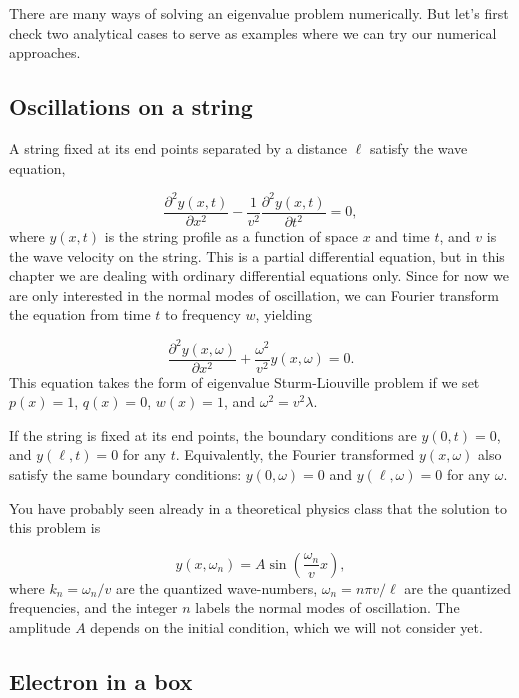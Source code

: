 There are many ways of solving an eigenvalue problem numerically. But let's first check two analytical cases to serve as examples where we can try our numerical approaches.

\subsection{Oscillations on a string}

A string fixed at its end points separated by a distance $\ell$ satisfy the wave equation,

\begin{equation}
 \dfrac{\partial^2 y(x,t)}{\partial x^2} - \dfrac{1}{v^2} \dfrac{\partial^2 y(x,t)}{\partial t^2} = 0,
\end{equation}
where $y(x,t)$ is the string profile as a function of space $x$ and time $t$, and $v$ is the wave velocity on the string. This is a partial differential equation, but in this chapter we are dealing with ordinary differential equations only. Since for now we are only interested in the normal modes of oscillation, we can Fourier transform the equation from time $t$ to frequency $w$, yielding

\begin{equation}
 \dfrac{\partial^2 y(x,\omega)}{\partial x^2} + \dfrac{\omega^2}{v^2} y(x,\omega) = 0.
\end{equation}
This equation takes the form of eigenvalue Sturm-Liouville problem if we set $p(x) = 1$, $q(x) = 0$, $w(x) = 1$, and $\omega^2 = v^2 \lambda$.

If the string is fixed at its end points, the boundary conditions are $y(0,t) = 0$, and $y(\ell,t) = 0$ for any $t$. Equivalently, the Fourier transformed $y(x,\omega)$ also satisfy the same boundary conditions: $y(0, \omega) = 0$ and $y(\ell, \omega) = 0$ for any $\omega$.

You have probably seen already in a theoretical physics class that the solution to this problem is

\begin{equation}
 y(x,\omega_n) = A \sin\left(\dfrac{\omega_n}{v} x\right),
\end{equation}
where $k_n = \omega_n/v$ are the quantized wave-numbers, $\omega_n = n \pi v/\ell$ are the quantized frequencies, and the integer $n$ labels the normal modes of oscillation. The amplitude $A$ depends on the initial condition, which we will not consider yet.

\subsection{Electron in a box}

